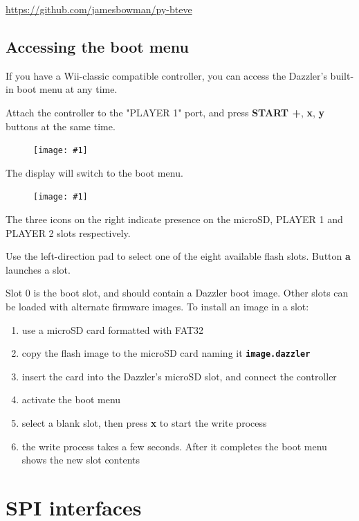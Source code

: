 \documentclass{article}
\newcommand{\pngw}[2]{
\begin{figure}[H]
\begin{center}
\texttt{[image: \#1]}
\end{center}
\end{figure}
}
\newcommand{\mach}[1]{\texttt{\textbf{#1}}}
\begin{document}
\url{https://github.com/jamesbowman/py-bteve}

\newpage
\subsection{Accessing the boot menu}\label{sec:bootmenu}

If you have a Wii-classic compatible controller,
you can access the Dazzler's built-in boot menu at any time.

Attach the controller to the "PLAYER 1" port, and press
\textbf{START +},
\textbf{x},
\textbf{y} buttons at the same time.

\pngw{img/gameduino-3x-dazzler/wii-bootmenu.png}{0.5}

The display will switch to the boot menu.

\pngw{img/gameduino-3x-dazzler/bootmenu1.png}{0.7}

The three icons on the right indicate presence on the
microSD, PLAYER 1 and PLAYER 2 slots respectively.

Use the left-direction pad to select one of the eight available flash slots.
Button \textbf{a} launches a slot.

Slot 0 is the boot slot, and should contain a Dazzler boot image. Other slots can be loaded with alternate firmware images.
To install an image in a slot:

\begin{enumerate}

\item use a microSD card formatted with FAT32

\item copy the flash image to the microSD card naming it \mach{image.dazzler}

\item insert the card into the Dazzler's microSD slot, and connect the controller

\item activate the boot menu

\item select a blank slot, then press \textbf{x} to start the write process

\item the write process takes a few seconds. After it completes the boot menu shows the new slot contents

\end{enumerate}

\newpage
\section{SPI interfaces}
\end{document}
